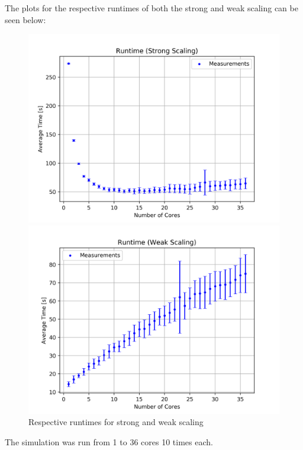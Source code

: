 \documentclass[12pt, a4paper, titlepage]{article}
\begin{document}
{The plots for the respective runtimes of both the strong and weak scaling can be seen below:
\begin{figure}[htbp]
	\begin{minipage}{0.49\textwidth} 
	\includegraphics[width=\textwidth]{pictures/avg_strong.png}
	\end{minipage}
	\hfill
	\begin{minipage}{0.49\textwidth}
	\includegraphics[width=\textwidth]{pictures/avg_weak.png}
	\end{minipage}
	\caption{Respective runtimes for strong and weak scaling}
	\label{fig:runtimes}
\end{figure}

The simulation was run from 1 to 36 cores 10 times each.

}
\end{document}
